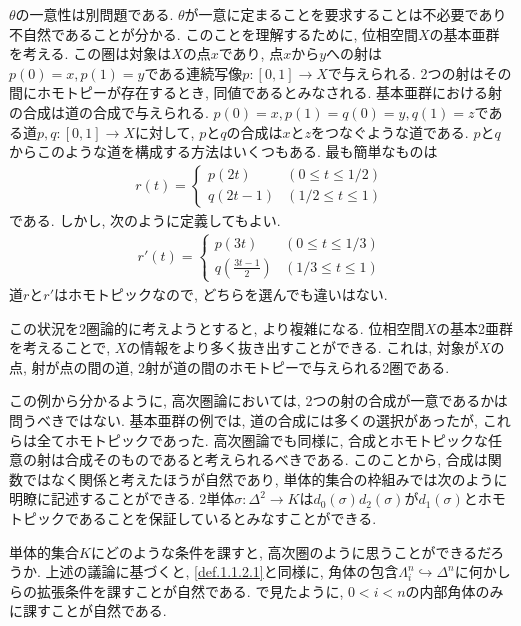 \documentclass[uplatex, a4paper, 14Q, dvipdfmx]{jsreport}
\begin{document}
$\theta$の一意性は別問題である.
$\theta$が一意に定まることを要求することは不必要であり不自然であることが分かる. 
このことを理解するために, 位相空間$X$の基本亜群を考える. 
この圏は対象は$X$の点$x$であり, 点$x$から$y$への射は$p(0)=x, p(1)=y$である連続写像$p : [0,1] \to X$で与えられる. 
2つの射はその間にホモトピーが存在するとき, 同値であるとみなされる. 
基本亜群における射の合成は道の合成で与えられる. 
$p(0)=x, p(1)=q(0)=y, q(1)=z$である道$p,q : [0,1] \to X$に対して, $p$と$q$の合成は$x$と$z$をつなぐような道である. 
$p$と$q$からこのような道を構成する方法はいくつもある. 
最も簡単なものは 
\begin{align*}
  r(t)
  = \begin{cases}
    p(2t) & (0 \leq t \leq 1/2) \\
    q(2t-1) & (1/2 \leq t \leq 1)
  \end{cases}
\end{align*}
である. 
しかし, 次のように定義してもよい. 
\begin{align*}
  r'(t)
  = \begin{cases}
    p(3t) & (0 \leq t \leq 1/3) \\
    q(\frac{3t-1}{2}) & (1/3 \leq t \leq 1)
  \end{cases}
\end{align*}
道$r$と$r'$はホモトピックなので, どちらを選んでも違いはない.

この状況を2圏論的に考えようとすると, より複雑になる. 
位相空間$X$の基本2亜群を考えることで, $X$の情報をより多く抜き出すことができる. 
これは, 対象が$X$の点, 射が点の間の道, 2射が道の間のホモトピーで与えられる2圏である.

この例から分かるように, 高次圏論においては, 2つの射の合成が一意であるかは問うべきではない. 
基本亜群の例では, 道の合成には多くの選択があったが, これらは全てホモトピックであった. 
高次圏論でも同様に, 合成とホモトピックな任意の射は合成そのものであると考えられるべきである. 
このことから, 合成は関数ではなく関係と考えたほうが自然であり, 単体的集合の枠組みでは次のように明瞭に記述することができる. 
2単体$\sigma : \Delta^2 \to K$は$d_0(\sigma)d_2(\sigma)$が$d_1(\sigma)$とホモトピックであることを保証しているとみなすことができる.

単体的集合$K$にどのような条件を課すと, 高次圏のように思うことができるだろうか. 
上述の議論に基づくと, \cref{def.1.1.2.1}と同様に, 角体の包含$\Lambda^n_i \hookrightarrow \Delta^n$に何かしらの拡張条件を課すことが自然である. 
で見たように, $0<i<n$の内部角体のみに課すことが自然である. 
\end{document}
